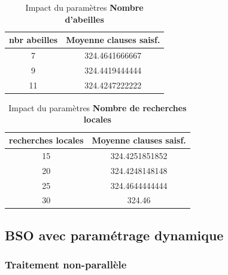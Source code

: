	
	\begin{table}[H]
		\centering
		
		\begin{tabular}{|c|c|}
			\hline
			\textbf{nbr abeilles} & \textbf{Moyenne clauses saisf.} \\ \hline
			\rowcolor[HTML]{67FD9A} 
			7            & 324.4641666667         \\ \hline
			9            & 324.4419444444         \\ \hline
			11           & 324.4247222222         \\ \hline
		\end{tabular}
		\caption{Impact du paramètres \textbf{Nombre d'abeilles}}
		\label{average3}
	\end{table}
	
	
	\begin{table}[H]
		\centering
			\begin{tabular}{|c|c|}
				\hline
				\textbf{recherches locales} & \textbf{Moyenne clauses saisf.} \\ \hline
				15                          & 324.4251851852                  \\ \hline
				20                          & 324.4248148148                  \\ \hline
				\rowcolor[HTML]{67FD9A} 
				25                          & 324.4644444444                  \\ \hline
				30                          & 324.46                          \\ \hline
			\end{tabular}%
		
		\caption{Impact du paramètres \textbf{Nombre de recherches locales}}
		\label{average4}
	\end{table}
	
	\subsection{BSO avec paramétrage dynamique }
	\subsubsection{Traitement non-parallèle}
